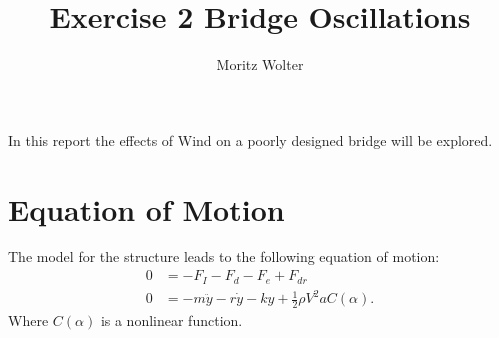 




\title{Exercise 2 Bridge Oscillations}
\author{Moritz Wolter}

\maketitle

In this report the effects of Wind on a poorly designed bridge will be explored.
\section{Equation of Motion}
The model for the structure leads to the following equation of motion:
\begin{align}
0 &= - F_I - F_d - F_e + F_{dr} \\
0 &= -m \ddot{y} - r\dot{y} - ky + \frac{1}{2} \rho V^2 a C(\alpha) \label{eq:motion}.
\end{align}
Where $C(\alpha)$ is a nonlinear function.
